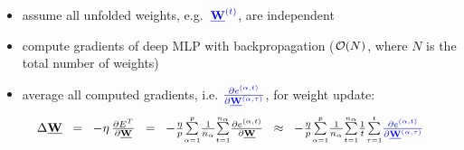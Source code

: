 \begin{frame}\frametitle{\subsubsecname}
	\begin{minipage}{\textwidth} \hspace{5mm}
	\end{minipage}
	\vspace{1mm}
	\begin{itemize}
		\item<1-> assume all unfolded weights, 
				e.g.~$\color{blue}\vec W^{(t)}$, are independent
		\vspace{1mm}
		\item<2-> compute gradients of deep MLP with backpropagation 
				($ \Set O(N)$, where $N$ is the total number of weights)
		\vspace{1mm}
		\item<3-> average all computed gradients, i.e.  
				${\color{blue} \frac{\partial e^{(\alpha,t)}}%
				{\partial \vec W^{(\alpha,\tau)}}}$, 
				for weight update:\\
				\vspace{-1mm}
			$$ \hspace{-5mm}
				\Delta \vec W \;\; = \;\;
					-\eta \, \smallfrac{\partial E^T}{\partial \vec W}
				\;\;=\;\; -\smallfrac{\eta}{p} 
					\smallsum{\alpha=1}{p} \smallfrac{1}{n_{\alpha}}  \smallsum{t=1}{n_{\alpha}}
					\smallfrac{\partial e^{(\alpha, t)}}{\partial \vec W}
				\;\;\approx\;\; -\smallfrac{\eta}{p}
					\smallsum{\alpha=1}{p} \smallfrac{1}{n_{\alpha}} \smallsum{t=1}{n_{\alpha}} \smallfrac{1}{t} \smallsum{\tau=1}{t}
					{\color{blue} \smallfrac{\partial e^{(\alpha,t)}}%
						{\partial \vec W^{(\alpha,\tau)}}}
			$$
	\end{itemize}
\end{frame}

